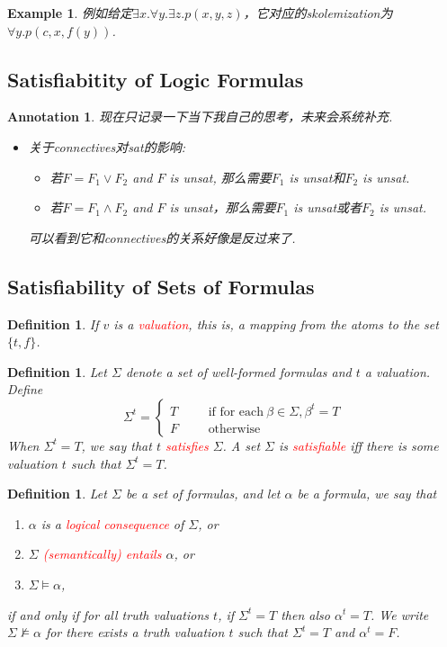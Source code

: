 \documentclass{article}
\theoremstyle{plain}
\newtheorem{example}[theorem]{Example}
\newtheorem{definition}[theorem]{Definition}
\newtheorem{annotation}[theorem]{Annotation}
\theoremstyle{nonumberplain}
\newcommand{\redt}[1]{\textcolor{red}{#1}}
\begin{document}
\begin{example}
\rm 例如给定$\exists x. \forall y. \exists z. p(x,y,z)$，它对应的skolemization为$\forall y. p(c,x,f(y))$.
\end{example}


\newpage
\subsection{Satisfiabitity of Logic Formulas}

\begin{annotation}
\rm 现在只记录一下当下我自己的思考，未来会系统补充. 
\begin{itemize}
	\item 关于connectives对sat的影响:
		\begin{itemize}
			\item 若$F = F_1 \vee F_2$ and $F$ is unsat, 那么需要$F_1$ is unsat和$F_2$ is unsat. 
			\item 若$F = F_1 \wedge F_2$ and $F$ is unsat，那么需要$F_1$ is unsat或者$F_2$ is unsat. 
		\end{itemize}
		可以看到它和connectives的关系好像是反过来了. 		 
\end{itemize}
\end{annotation}


\newpage
\subsection{Satisfiability of Sets of Formulas}

\begin{definition}
\rm If $v$ is a \redt{valuation}, this is, a mapping from the atoms to the set $\{t,f\}$.   
\end{definition}


\begin{definition}
\rm \cite{cs245-sat} Let $\Sigma$ denote a set of well-formed formulas and $t$ a valuation. Define 
$$
\Sigma^t = \left\{
\begin{aligned}
T &&& \text{if for each}~\beta \in \Sigma, \beta^t = T \\
F &&& \text{otherwise}
\end{aligned}\right.
$$
When $\Sigma^t = T$, we say that $t$ \redt{satisfies} $\Sigma$. A set $\Sigma$ is \redt{satisfiable} iff there is some valuation $t$ such that $\Sigma^t = T$. 
\end{definition}


\begin{definition}
\rm Let $\Sigma$ be a set of formulas, and let $\alpha$ be a formula, we say that 
\begin{enumerate}
	\item $\alpha$ is a \redt{logical consequence} of $\Sigma$, or
	\item $\Sigma$ \redt{(semantically) entails} $\alpha$, or
	\item $\Sigma \models \alpha$,
\end{enumerate}
if and only if for all truth valuations $t$, if $\Sigma^t = T$ then also $\alpha^t = T$. We write $\Sigma \nvDash \alpha$ for there exists a truth valuation $t$ such that $\Sigma^t = T$ and $\alpha^t = F$. 
\end{definition}
\end{document}
